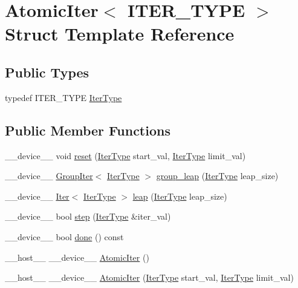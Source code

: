 \hypertarget{structAtomicIter}{\section{Atomic\-Iter$<$ I\-T\-E\-R\-\_\-\-T\-Y\-P\-E $>$ Struct Template Reference}
\label{structAtomicIter}
}
\subsection*{Public Types}
\begin{DoxyCompactItemize}
\item 
typedef I\-T\-E\-R\-\_\-\-T\-Y\-P\-E \hyperlink{structAtomicIter_ac4cb9a13323893a58f79106c796db94a}{Iter\-Type}
\end{DoxyCompactItemize}
\subsection*{Public Member Functions}
\begin{DoxyCompactItemize}
\item 
\-\_\-\-\_\-device\-\_\-\-\_\- void \hyperlink{structAtomicIter_ae29ae4fc1c50539b471eb66c2824e51b}{reset} (\hyperlink{structAtomicIter_ac4cb9a13323893a58f79106c796db94a}{Iter\-Type} start\-\_\-val, \hyperlink{structAtomicIter_ac4cb9a13323893a58f79106c796db94a}{Iter\-Type} limit\-\_\-val)
\item 
\-\_\-\-\_\-device\-\_\-\-\_\- \hyperlink{structGroupIter}{Group\-Iter}$<$ \hyperlink{structAtomicIter_ac4cb9a13323893a58f79106c796db94a}{Iter\-Type} $>$ \hyperlink{structAtomicIter_aa2f6d797f02ef618e5f6f34b3f3cf11e}{group\-\_\-leap} (\hyperlink{structAtomicIter_ac4cb9a13323893a58f79106c796db94a}{Iter\-Type} leap\-\_\-size)
\item 
\-\_\-\-\_\-device\-\_\-\-\_\- \hyperlink{structIter}{Iter}$<$ \hyperlink{structAtomicIter_ac4cb9a13323893a58f79106c796db94a}{Iter\-Type} $>$ \hyperlink{structAtomicIter_aa8be3fe73587281089068a9529050700}{leap} (\hyperlink{structAtomicIter_ac4cb9a13323893a58f79106c796db94a}{Iter\-Type} leap\-\_\-size)
\item 
\-\_\-\-\_\-device\-\_\-\-\_\- bool \hyperlink{structAtomicIter_a439c93c7ad77271adefe12d402f5c321}{step} (\hyperlink{structAtomicIter_ac4cb9a13323893a58f79106c796db94a}{Iter\-Type} \&iter\-\_\-val)
\item 
\-\_\-\-\_\-device\-\_\-\-\_\- bool \hyperlink{structAtomicIter_acf98c8c6588eb505c6569d50b23a17d0}{done} () const 
\item 
\-\_\-\-\_\-host\-\_\-\-\_\- \-\_\-\-\_\-device\-\_\-\-\_\- \hyperlink{structAtomicIter_afd9f606b7cbc27c5b3bf4836f8db6d63}{Atomic\-Iter} ()
\item 
\-\_\-\-\_\-host\-\_\-\-\_\- \-\_\-\-\_\-device\-\_\-\-\_\- \hyperlink{structAtomicIter_af5bcb85d915ca220f2d9f6c2ac759e58}{Atomic\-Iter} (\hyperlink{structAtomicIter_ac4cb9a13323893a58f79106c796db94a}{Iter\-Type} start\-\_\-val, \hyperlink{structAtomicIter_ac4cb9a13323893a58f79106c796db94a}{Iter\-Type} limit\-\_\-val)
\end{DoxyCompactItemize}

